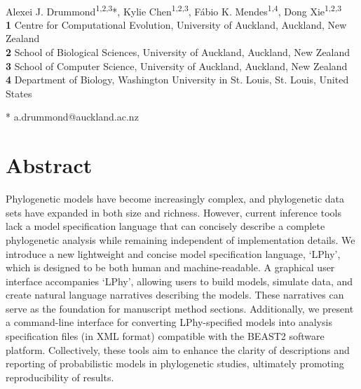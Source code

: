 \documentclass[10pt,letterpaper,table]{article}
\theoremstyle{definition}
\begin{document}
\vspace*{0.2in}

\begin{flushleft}
{\Large
\textbf{} 
}
\newline
\\
Alexei J. Drummond\textsuperscript{1,2,3}*,
Kylie Chen\textsuperscript{1,2,3},
F\'{a}bio K. Mendes\textsuperscript{1,4},
Dong Xie\textsuperscript{1,2,3}
\\
\bigskip
\textbf{1} Centre for Computational Evolution, University of Auckland, Auckland, New Zealand
\\
\textbf{2} School of Biological Sciences, University of Auckland, Auckland, New Zealand
\\
\textbf{3} School of Computer Science, University of Auckland, Auckland, New Zealand
\\
\textbf{4} Department of Biology, Washington University in St. Louis, St. Louis, United States
\\
\bigskip

* a.drummond@auckland.ac.nz

\end{flushleft}

\section*{Abstract}
Phylogenetic models have become increasingly complex, and phylogenetic data sets have expanded in both size and richness. 
However, current inference tools lack a model specification language that can concisely describe a complete phylogenetic analysis while remaining independent of implementation details. 
We introduce a new lightweight and concise model specification language, `LPhy', which is designed to be both human and machine-readable. 
A graphical user interface accompanies `LPhy', allowing users to build models, simulate data, and create natural language narratives describing the models. 
These narratives can serve as the foundation for manuscript method sections. 
Additionally, we present a command-line interface for converting LPhy-specified models into analysis specification files (in XML format) compatible with the BEAST2 software platform. 
Collectively, these tools aim to enhance the clarity of descriptions and reporting of probabilistic models in phylogenetic studies, ultimately promoting reproducibility of results.
\end{document}
